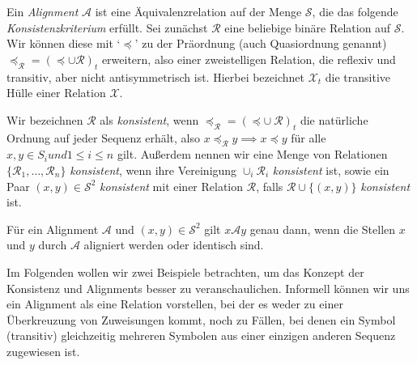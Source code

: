 \begin{definition}\label{def:konsistenz}
	Ein \emph{Alignment} $\mathcal{A}$ ist eine Äquivalenzrelation auf der Menge $\mathcal{S}$, die das folgende \emph{Konsistenzkriterium} erfüllt. Sei zunächst $\mathcal{R}$ eine beliebige binäre Relation auf $\mathcal{S}$. Wir können diese mit `$\preceq$' zu der Präordnung (auch Quasiordnung genannt) $\preceq_{\mathcal{R}}=(\preceq \cup \mathcal{R})_t$ erweitern, also einer zweistelligen Relation, die reflexiv und transitiv, aber nicht antisymmetrisch ist. Hierbei bezeichnet $\mathcal{X}_t$ die transitive Hülle einer Relation $\mathcal{X}$. 
	
	Wir bezeichnen $\mathcal{R}$ als \emph{konsistent}, wenn $\preceq_{\mathcal{R}}=(\preceq \cup\: \mathcal{R})_t$ die natürliche Ordnung auf jeder Sequenz erhält, also $x \preceq_{\mathcal{R}} y \implies x \preceq y$ für alle $x,y \in S_i und 1\leq i\leq n$ gilt. Außerdem nennen wir eine Menge von Relationen $\{\mathcal{R}_1, \dots, \mathcal{R}_n\}$ \emph{konsistent}, wenn ihre Vereinigung $\cup_i \mathcal{R}_i$ \emph{konsistent} ist, sowie ein Paar $(x,y) \in \mathcal{S}^2$ \emph{konsistent} mit einer Relation $\mathcal{R}$, falls $\mathcal{R} \cup \{(x,y)\}$ \emph{konsistent} ist.
	
	Für ein Alignment $\mathcal{A}$ und $(x,y) \in \mathcal{S}^2$ gilt $x\mathcal{A}y$ genau dann, wenn die Stellen $x$ und $y$ durch $\mathcal{A}$ aligniert werden oder identisch sind.
\end{definition}

Im Folgenden wollen wir zwei Beispiele betrachten, um das Konzept der Konsistenz und Alignments besser zu veranschaulichen. Informell können wir uns ein Alignment als eine Relation vorstellen, bei der es weder zu einer Überkreuzung von Zuweisungen kommt, noch zu Fällen, bei denen ein Symbol (transitiv) gleichzeitig mehreren Symbolen aus einer einzigen anderen Sequenz zugewiesen ist.

